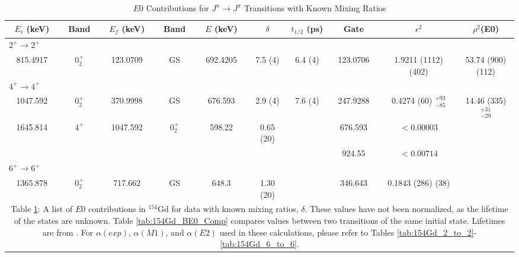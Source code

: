 \begin{landscape}
\begin{table}
    \caption{$E0$ Contributions for $J^{\pi}\rightarrow J^{\pi}$ Transitions with Known Mixing Ratios}
    \label{tab:154Gd_E0_d}
    \begin{tabular}{c|c|c|c|c|c|c|c|c|c}
        \toprule
        $E_i$ (keV)	& Band &	$E_f$ (keV)	& Band & $E$ (keV)	& $\delta$ & $t_{1/2}$ (ps) & Gate &	$\epsilon^2$	& $\rho^2$(E0)	\\
        \hline
        \multicolumn{10}{l}{$2^+\rightarrow 2^+$} 	\\ \hline
        815.4917 & $0^+_2$ & 123.0709 & GS & 692.4205 & 7.5 (4) & 6.4 (4) & 123.0706 & 1.9211 (1112) (402) & 53.74 (900) (112) \\ \hline
        \multicolumn{8}{l}{$4^+\rightarrow 4^+$} 	\\ \hline
        1047.592 & $0^+_2$ & 370.9998 & GS & 676.593 & 2.9 (4) & 7.6 (4) & 247.9288 & 0.4274 (60) $^{+93}_{-85}$ & 14.46 (335) $^{+31}_{-29}$\\ \hline
        1645.814 & $4^+$ & 1047.592 & $0^+_2$ & 598.22 & 0.65 (20) & & 676.593 &  $<0.00003$  \\ 
         &  &  &  & & & & 924.55 &  $<0.00714$ \\ \hline
        \multicolumn{10}{l}{$6^+\rightarrow 6^+$} 	\\ \hline
        1365.878 & $0^+_2$ & 717.662 & GS & 648.3 & 1.30 (20)  & & 346.643 & 0.1843 (286) (38) \\
        \bottomrule
        \multicolumn{10}{p{1.4\textwidth}}{Table \ref{tab:154Gd_E0_d}: A list of $E0$ contributions in $^{154}$Gd for data with known mixing ratios, $\delta$. These values have not been normalized, as the lifetime of the states are unknown. Table \ref{tab:154Gd_BE0_Comp} compares values between two transitions of the same initial state. Lifetimes are from \citep{tonev04:_154gd}. For $\alpha(exp)$, $\alpha(M1)$, and $\alpha(E2)$ used in these calculations, please refer to Tables \ref{tab:154Gd_2_to_2}-\ref{tab:154Gd_6_to_6}.}
	\end{tabular}
\end{table}
\end{landscape}